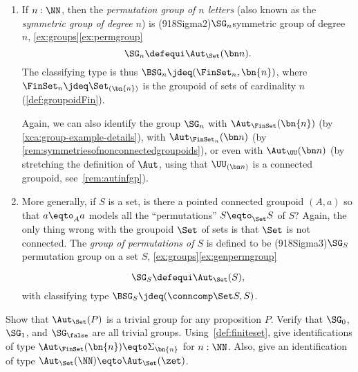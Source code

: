 \begin{example}
\begin{enumerate}
{Issues concerning universes are nontrivial and important,
but in this text we have chosen to focus on other matters.
}
 
  \item\label{ex:permgroup}
    If $n:\NN$, then the \emph{permutation group of $n$ letters}
    (also known as the \emph{symmetric group of degree $n$}) is%
    \glossary(918Sigma2){$\protect\SG_n$}{symmetric group of degree $n$,
      \cref{ex:groups}\ref{ex:permgroup}}%
    \[
      \SG_n\defequi \Aut_{\Set}(\bn n). %
    \]
    The classifying type is thus $\BSG_n\jdeq (\FinSet_n,\bn{n})$,   
    where $\FinSet_n \jdeq \Set_{(\bn{n})}$ is the groupoid of 
    sets of cardinality $n$ (\cf \ref{def:groupoidFin}).
    
    Again, we can also identify the group $\SG_n$ with
    $\Aut_\FinSet(\bn{n})$ (by \cref{xca:group-example-details}), with 
    $\Aut_{\FinSet_n}(\bn n)$ (by \cref{rem:symmetriesofnonconnectedgroupoids}),
    or even with $\Aut_{\UU}(\bn n)$ (by stretching the definition of $\Aut$,
    using that $\UU_{(\bn n)}$ is a connected groupoid, see~\cref{rem:autinfgp}).



  \item\label{ex:genpermgroup}
    More generally, if $S$ is a set, is there a pointed connected groupoid $(A,a)$ so that $a\eqto_Aa$ models all the ``permutations'' $S\eqto_{\Set}S$ of $S$?
    Again, the only thing wrong with the groupoid $\Set$ of sets
    is that $\Set$ is not connected.
    The \emph{group of permutations of $S$} is defined to be%
    \glossary(918Sigma3){$\protect\SG_S$}{permutation group on a set $S$,
      \cref{ex:groups}\ref{ex:genpermgroup}}%

    \[
      \SG_S\defequi \Aut_{\Set}(S),
    \]
    with classifying type $\BSG_S\jdeq(\conncomp \Set S,S)$.\qedhere
  \end{enumerate}
\end{example}

\begin{xca}
  \label{xca:group-example-details}
  Show that $\Aut_{\Set}(P)$ is a trivial group for any proposition $P$.
  Verify that $\SG_0$, $\SG_1$, and $\SG_\false$ are all trivial groups.
  Using~\cref{def:finiteset}, give identifications of type 
  $\Aut_\FinSet(\bn{n})\eqto\Sigma_{\bn{n}}$ for $n:\NN$.
  Also, give an identification of type $\Aut_\Set(\NN)\eqto\Aut_\Set(\zet)$. 
\end{xca}



